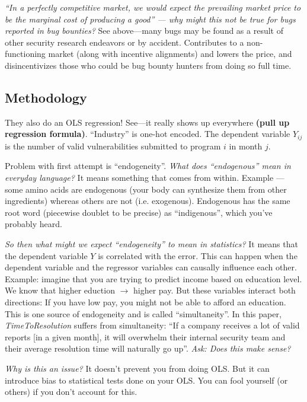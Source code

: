 \documentclass[11pt]{article}
\begin{document}
{\it ``In a perfectly competitive market, we would expect the prevailing market price to be the marginal cost of producing a good'' --- why might this not be true for bugs reported in bug bounties?} See above---many bugs may be found as a result of other security research endeavors or by accident. Contributes to a non-functioning market (along with incentive alignments) and lowers the price, and disincentivizes those who could be bug bounty hunters from doing so full time. 

\subsection{Methodology}

They also do an OLS regression! See---it really shows up everywhere {\bf (pull up regression formula)}. ``Industry'' is one-hot encoded. The dependent variable $Y_{ij}$ is the number of valid vulnerabilities submitted to program $i$ in month $j$.

Problem with first attempt is ``endogeneity''. {\it What does ``endogenous'' mean in everyday language?} It means something that comes from within. Example --- some amino acids are endogenous (your body can synthesize them from other ingredients) whereas others are not (i.e. exogenous). Endogenous has the same root word (piecewise doublet to be precise) as ``indigenous'', which you've probably heard. 


{\it So then what might we expect ``endogeneity'' to mean in statistics?} It means that the dependent variable $Y$ is correlated with the error. This can happen when the dependent variable and the regressor variables can causally influence each other. Example: imagine that you are trying to predict income based on education level. We know that higher eduction $\rightarrow$ higher pay. But these variables interact both directions: If you have low pay, you might not be able to afford an education. This is one source of endogeneity and is called ``simultaneity''. In this paper, {\it TimeToResolution} suffers from simultaneity: ``If a company receives a lot of valid reports [in a given month], it will overwhelm their internal security team and their average resolution time will naturally go up''. {\it Ask: Does this make sense?}


{\it Why is this an issue?} It doesn't prevent you from doing OLS. But it can introduce bias to statistical tests done on your OLS. You can fool yourself (or others) if you don't account for this. 
\end{document}

